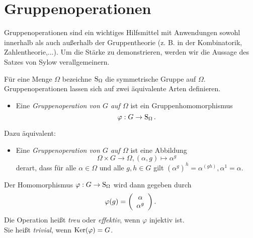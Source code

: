 \section{Gruppenoperationen}

Gruppenoperationen sind ein wichtiges Hilfsmittel mit Anwendungen sowohl innerhalb als auch au\ss{}erhalb der Gruppentheorie (z. B. in der Kombinatorik, Zahlentheorie,...). Um die St\"arke zu demonstrieren, werden wir die Aussage des Satzes von Sylow verallgemeinern.

F\"ur eine Menge $\Omega$ bezeichne $\operatorname{S}_\Omega$ die symmetrische Gruppe auf $\Omega$. Gruppenoperationen lassen sich auf zwei \"aquivalente Arten definieren.

\begin{definition}[Operation]\spspace
\begin{itemize}
 \item Eine \emph{Gruppenoperation von $G$ auf $\Omega$} ist ein Gruppenhomomorphismus $$\varphi:G\to \operatorname{S}_\Omega.$$
\end{itemize}
Dazu \"aquivalent:
\begin{itemize}
 \item Eine \emph{Gruppenoperation von $G$ auf $\Omega$} ist eine Abbildung $$\Omega \times G \to \Omega, (\alpha,g)\longmapsto \alpha^g$$ derart, dass f\"ur alle $\alpha\in \Omega$ und alle $g,h\in G$ gilt $(\alpha^g)^h=\alpha^{(gh)},\alpha^1=\alpha$.
\end{itemize}
Der Homomorphismus $\varphi:G\to \operatorname{S}_\Omega$ wird dann gegeben durch $$\varphi(g)=\left(\begin{array}{c}\alpha \\ \alpha^g 
\end{array}\right).$$
Die Operation hei\ss{}t \emph{treu} oder \emph{effektiv}, wenn $\varphi$ injektiv ist.\\
Sie hei\ss{}t \emph{trivial}, wenn $\operatorname{Ker}(\varphi) = G$.

\end{definition}

